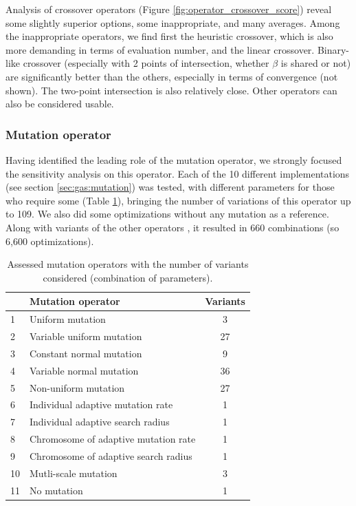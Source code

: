 \documentclass[twocol]{ametsoc}
\begin{document}
Analysis of crossover operators (Figure \ref{fig:operator_crossover_score}) reveal some slightly superior options, some inappropriate, and many averages. Among the inappropriate operators, we find first the heuristic crossover, which is also more demanding in terms of evaluation number, and the linear crossover. Binary-like crossover (especially with 2 points of intersection, whether $\beta$ is shared or not) are significantly better than the others, especially in terms of convergence (not shown). The two-point intersection is also relatively close. Other operators can also be considered usable.


\subsubsection{Mutation operator}

Having identified the leading role of the mutation operator, we strongly focused the sensitivity analysis on this operator. Each of the 10 different implementations (see section \ref{sec:gas:mutation}) was tested, with different parameters for those who require some (Table \ref{tab:assessed_mutation_operators}), bringing the number of variations of this operator up to 109. We also did some optimizations without any mutation as a reference. Along with variants of the other operators \citep[see][for the details]{Horton2012a}, it resulted in 660 combinations (so 6,600 optimizations).

\begin{table}[htbp]
	\caption{Assessed mutation operators with the number of variants considered (combination of parameters).}
	\begin{center}
		\begin{tabular}{llc}
			\hline\hline  & \textbf{Mutation operator} & \textbf{Variants}\\ 
			\hline 
			1 & Uniform mutation & 3 \\
			2 & Variable uniform mutation & 27 \\
			3 & Constant normal mutation & 9 \\
			4 & Variable normal mutation & 36 \\
			5 & Non-uniform mutation & 27 \\
			6 & Individual adaptive mutation rate & 1 \\
			7 & Individual adaptive search radius & 1 \\
			8 & Chromosome of adaptive mutation rate & 1 \\
			9 & Chromosome of adaptive search radius & 1 \\
			10 & Mutli-scale mutation & 3 \\
			11 & No mutation & 1 \\
			\hline
		\end{tabular}
	\end{center}
	\label{tab:assessed_mutation_operators}
\end{table}
\end{document}
